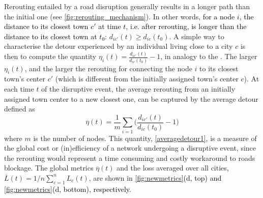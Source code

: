 \documentclass[twocolumn,fleqn,10pt]{wlscirep}
\begin{document}
Rerouting entailed by a road disruption generally results in a longer path than the initial one (see \cref{fig:rerouting_mechanism}). In other words, \textcolor{black}{for a node $i$, the distance to its closest town $c'$ at time $t$, i.e. after rerouting, is longer than the distance to its closest town at $t_0$}: $d_{ic'}(t) \geq d_{ic}(t_0)$. A simple way to characterise the detour experienced by an individual living close to \textcolor{black}{a} city $c$ is then to compute the quantity $\eta_i(t) = \frac{d_{ic'}(t)}{d_{ic}(t_0)}-1$, in analogy to the  \cite{Barthelemy,Aldous}. The larger $\eta_i(t)$, and the larger the rerouting for connecting the node $i$ to its closest town's center $c'$ (which is different from the initially assigned town's center $c$). At each time $t$ of the disruptive event, the average rerouting from an initially assigned town center to a new closest one, can be captured by the average detour defined as
\begin{equation}
\overline{\eta}(t) = \frac{1}{m}\sum_{i=1} \bigg( \frac{d_{ic'}(t)}{d_{ic}(t_0)}-1\bigg) 
\label{averagedetour1}
\end{equation}
where $m$ is the number of nodes. This quantity\textcolor{black}{,} \cref{averagedetour1}\textcolor{black}{,} is a measure of the global cost or (in)efficiency of a network undergoing a disruptive event, since the rerouting would represent a time consuming and costly workaround to roads blockage. The global metrics $\overline{\eta}(t)$ and the loss averaged over all cities\textcolor{black}{,} $\overline{L}(t)=1/n\sum_{c=1}^nL_c(t)$, are shown in
\textcolor{black}{\cref{fig:newmetrics}(d, top) and \cref{fig:newmetrics}(d, bottom), respectively.}
\end{document}
